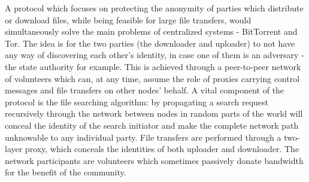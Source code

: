 A protocol which focuses on protecting the anonymity of parties which 
distribute or download files, while being feasible for large file transfers, 
would simultaneously solve the main problems of centralized systems - 
BitTorrent and Tor. The idea is for the two parties (the downloader and 
uploader) to not have any way of discovering each other's identity, in case one 
of them is an adversary - the state authority for example. This is achieved 
through a peer-to-peer network of volunteers which can, at any time, assume the 
role of proxies carrying control messages and file transfers on other nodes' 
behalf. A vital component of the protocol is the file searching algorithm: by 
propagating a search request recursively through the network between nodes in 
random parts of the world will conceal the identity of the search initiator and 
make the complete network path unknowable to any individual party. File 
transfers are performed through a two-layer proxy, which conceals the 
identities of both uploader and downloader. The network participants are 
volunteers which sometimes passively donate bandwidth for the benefit of the 
community.
